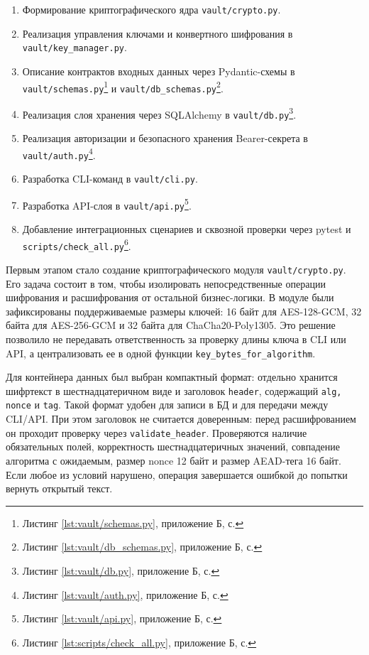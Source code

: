 \documentclass[14pt, a4paper]{extarticle}
\newcommand{\listingsappendix}{Б}
\newcommand{\listingfootnote}[1]{\footnote{Листинг \ref{#1}, приложение \listingsappendix{}, с. \pageref{#1}}}
\begin{document}
	\begin{enumerate}
	\item Формирование криптографического ядра \texttt{vault/crypto.py}.
	\item Реализация управления ключами и конвертного шифрования в \texttt{vault/key\_manager.py}.
	\item Описание контрактов входных данных через Pydantic-схемы в \texttt{vault/schemas.py}\listingfootnote{lst:vault/schemas.py} и \texttt{vault/db\_schemas.py}\listingfootnote{lst:vault/db_schemas.py}.
	\item Реализация слоя хранения через SQLAlchemy в \texttt{vault/db.py}\listingfootnote{lst:vault/db.py}.
	\item Реализация авторизации и безопасного хранения Bearer-секрета в \texttt{vault/auth.py}\listingfootnote{lst:vault/auth.py}.
	\item Разработка CLI-команд в \texttt{vault/cli.py}.
	\item Разработка API-слоя в \texttt{vault/api.py}\listingfootnote{lst:vault/api.py}.
	\item Добавление интеграционных сценариев и сквозной проверки через pytest и \texttt{scripts/check\_all.py}\listingfootnote{lst:scripts/check_all.py}.
	\end{enumerate}
	
	Первым этапом стало создание криптографического модуля \texttt{vault/crypto.py}. Его задача состоит в том, чтобы изолировать непосредственные операции шифрования и расшифрования от остальной бизнес-логики. В модуле были зафиксированы поддерживаемые размеры ключей: 16 байт для AES-128-GCM, 32 байта для AES-256-GCM и 32 байта для ChaCha20-Poly1305. Это решение позволило не передавать ответственность за проверку длины ключа в CLI или API, а централизовать ее в одной функции \texttt{key\_bytes\_for\_algorithm}.
	
	Для контейнера данных был выбран компактный формат: отдельно хранится шифртекст в шестнадцатеричном виде и заголовок \texttt{header}, содержащий \texttt{alg, nonce} и \texttt{tag}. Такой формат удобен для записи в БД и для передачи между CLI/API. При этом заголовок не считается доверенным: перед расшифрованием он проходит проверку через \texttt{validate\_header}. Проверяются наличие обязательных полей, корректность шестнадцатеричных значений, совпадение алгоритма с ожидаемым, размер nonce 12 байт и размер AEAD-тега 16 байт. Если любое из условий нарушено, операция завершается ошибкой до попытки вернуть открытый текст.
	
\end{document}
